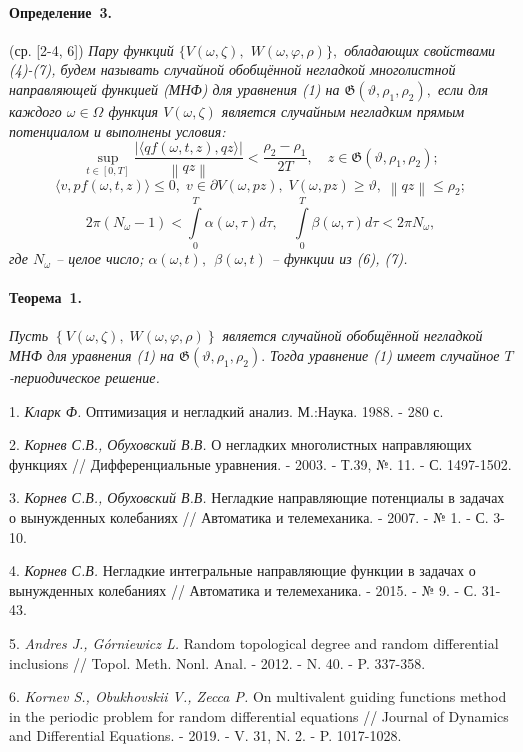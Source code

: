 \paragraph{Определение~3.} (ср. [2-4, 6])
{\it
Пару функций $\{ V(\omega,\zeta),$ \linebreak $W(\omega,\varphi,\rho ) \},$ обладающих свойствами (4)-(7),
будем называть случайной обобщённой негладкой многолистной на\-прав\-ляющей функцией (МНФ) для уравнения (1) на \linebreak $\mathfrak{G} \left({\vartheta ,\rho _{1} ,\rho _{2} } \right),$ если для каждого $\omega\in\Omega$ функция $V(\omega,\zeta)$ является случайным негладким прямым потенциалом и выполнены условия:
$$
 \mathop {\sup}\limits_{t \in \left[ {0,T} \right]}\frac{{\left| {\langle {qf(\omega, t, z),qz} \rangle} \right|}}{{\left\|{qz} \right\|}} < \frac{{\rho _{2} - \rho _{1} }}{{2T}},\quad z\in \mathfrak{G} (\vartheta ,\rho _{1} ,\rho _{2} );
$$
$$
\langle v, pf(\omega, t, z)\rangle \leq 0,\; v \in \partial V(\omega,pz),\; V(\omega,pz) \ge \vartheta ,\;\left\| {qz} \right\| \le \rho _{2};
$$
$$
2\pi (N_{\omega} - 1) < \int\limits_{0}^{T} {\alpha(\omega,\tau )d\tau } , \quad
\int\limits_{0}^{T} {\beta(\omega,\tau )d\tau < 2\pi N_{\omega}} ,
$$
где $N_{\omega}$ -- целое число; $\alpha(\omega,t),\,\;\beta(\omega,t)$ -- функции из (6), (7).
}

\paragraph{Теорема~1.}
{\it
Пусть $\left\{ {V(\omega,\zeta),\;W(\omega,\varphi,\rho )} \right\}$ является случайной обобщённой негладкой МНФ для уравнения (1) на \linebreak $\mathfrak{G} \left({\vartheta ,\rho _{1} ,\rho _{2} } \right).$   Тогда уравнение (1) имеет случайное $T$-пе\-риоди\-ческое ре\-ше\-ние.
}


\litlist

1. {\it Кларк Ф.}
Оптимизация и негладкий анализ. М.:Наука. 1988. - 280 с.

2. {\it Корнев С.В., Обуховский В.В.}
О негладких многолистных направляющих функциях // Дифференциальные уравнения. - 2003. - Т.39, №. 11. - С. 1497-1502.

3. {\it Корнев С.В., Обуховский В.В.}
Негладкие направляющие потенциалы в задачах о вынужденных колебаниях // Автоматика и телемеханика. - 2007. - № 1. - С. 3-10.

4. {\it Корнев С.В.}
Негладкие интегральные направляющие функции в задачах о вынужденных колебаниях // Автоматика и телемеханика. - 2015. - № 9. - С. 31-43.

5. {\it Andres J., G\'orniewicz L.}
Random topological degree and random differential inclusions // Topol. Meth. Nonl. Anal. - 2012. - N. 40. - P. 337-358.

6. {\it Kornev S., Obukhovskii V., Zecca P.}
On multivalent guiding functions method in the periodic problem for random differential equations // Journal of Dynamics and Differential Equations. - 2019. - V. 31, N. 2. - P. 1017-1028.
